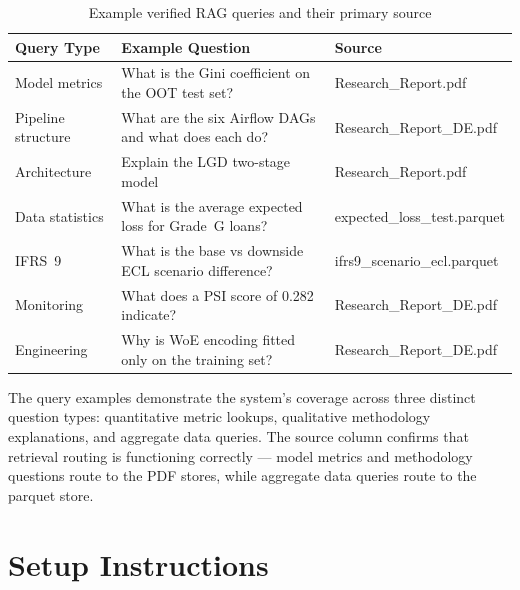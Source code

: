 \documentclass[12pt,a4paper]{report}
\begin{document}
\begin{table}[H]
\centering
\caption{Example verified RAG queries and their primary source}
\label{tab:rag_queries}
\begin{tabularx}{\textwidth}{lXl}
\toprule
\textbf{Query Type} & \textbf{Example Question} & \textbf{Source} \\
\midrule
Model metrics     & What is the Gini coefficient on the OOT test set?     & Research\_Report.pdf \\
Pipeline structure & What are the six Airflow DAGs and what does each do? & Research\_Report\_DE.pdf \\
Architecture      & Explain the LGD two-stage model                       & Research\_Report.pdf \\
Data statistics   & What is the average expected loss for Grade~G loans?  & expected\_loss\_test.parquet \\
IFRS~9            & What is the base vs downside ECL scenario difference? & ifrs9\_scenario\_ecl.parquet \\
Monitoring        & What does a PSI score of 0.282 indicate?              & Research\_Report\_DE.pdf \\
Engineering       & Why is WoE encoding fitted only on the training set?  & Research\_Report\_DE.pdf \\
\bottomrule
\end{tabularx}
\end{table}

\medskip
\noindent The query examples demonstrate the system's coverage across three distinct question types: quantitative metric lookups, qualitative methodology explanations, and aggregate data queries. The source column confirms that retrieval routing is functioning correctly --- model metrics and methodology questions route to the PDF stores, while aggregate data queries route to the parquet store.

\section{Setup Instructions}
\end{document}
